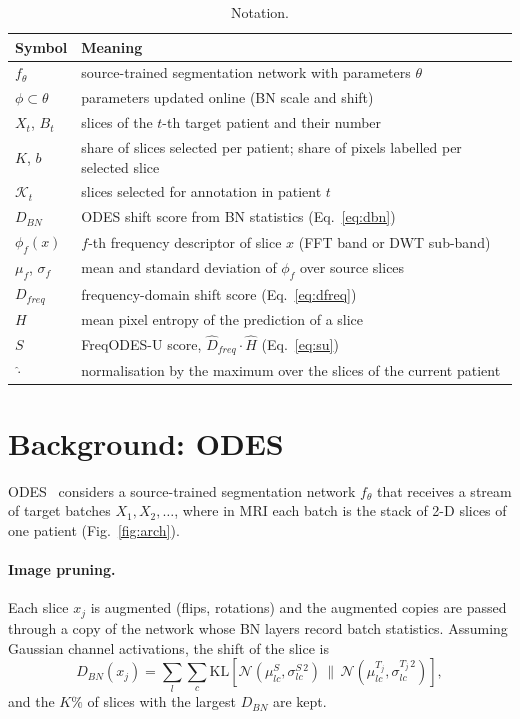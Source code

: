 \documentclass[a4paper,fleqn]{cas-dc}
\begin{document}
\begin{table}[!htbp]
\caption{Notation.}
\label{tab:notation}
\centering\footnotesize
\begin{tabular}{@{}p{}p{}@{}}
\toprule
Symbol & Meaning \\
\midrule
$f_\theta$ & source-trained segmentation network with parameters $\theta$ \\
$\phi\subset\theta$ & parameters updated online (BN scale and shift) \\
$X_t$, $B_t$ & slices of the $t$-th target patient and their number \\
$K$, $b$ & share of slices selected per patient; share of pixels labelled per selected slice \\
$\mathcal{K}_t$ & slices selected for annotation in patient $t$ \\
$D_{BN}$ & ODES shift score from BN statistics (Eq.~\ref{eq:dbn}) \\
$\phi_f(x)$ & $f$-th frequency descriptor of slice $x$ (FFT band or DWT sub-band) \\
$\mu_f$, $\sigma_f$ & mean and standard deviation of $\phi_f$ over source slices \\
$D_{freq}$ & frequency-domain shift score (Eq.~\ref{eq:dfreq}) \\
$H$ & mean pixel entropy of the prediction of a slice \\
$S$ & FreqODES-U score, $\hat D_{freq}\cdot\hat H$ (Eq.~\ref{eq:su}) \\
$\hat{\cdot}$ & normalisation by the maximum over the slices of the current patient \\
\bottomrule
\end{tabular}
\end{table}

\section{Background: ODES}\label{sec:odes}
ODES~\cite{islam2025odes} considers a source-trained segmentation network $f_\theta$ that receives a stream of target batches $X_1,X_2,\dots$, where in MRI each batch is the stack of 2-D slices of one patient (Fig.~\ref{fig:arch}).

\paragraph{Image pruning.} Each slice $x_j$ is augmented (flips, rotations) and the augmented copies are passed through a copy of the network whose BN layers record batch statistics. Assuming Gaussian channel activations, the shift of the slice is
\begin{equation}
D_{BN}(x_j)=\sum_{l}\sum_{c}\mathrm{KL}\!\left[\mathcal{N}(\mu^S_{lc},\sigma^{S\,2}_{lc})\,\big\|\,\mathcal{N}(\mu^{T_j}_{lc},\sigma^{T_j\,2}_{lc})\right],
\label{eq:dbn}
\end{equation}
and the $K\%$ of slices with the largest $D_{BN}$ are kept.
\end{document}
